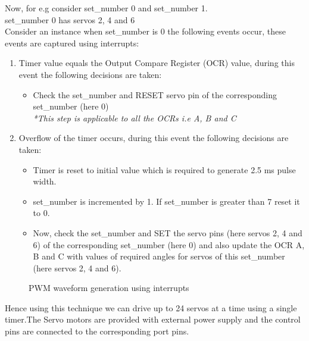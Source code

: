 \documentclass[12pt]{article}
\begin{document}
\vspace{2cm}
Now, for e.g consider set\_number 0 and set\_number 1.\\
set\_number 0 has servos 2, 4 and 6\\
Consider an instance when set\_number is 0 the following events occur, these events are
captured using interrupts:\\
\begin{enumerate}
	\item Timer value equals the Output Compare Register (OCR) value, during this event
	the following decisions are taken:
	\begin{itemize}
	\item Check the set\_number and RESET servo pin of the corresponding
	set\_number (here 0)\\
	\textit{*This step is applicable to all the OCRs i.e A, B and C}
	\end{itemize}
	\item Overflow of the timer occurs, during this event the following decisions are
	taken:
	\begin{itemize}
		\item Timer is reset to initial value which is required to generate 2.5 ms pulse
		width.
		\item set\_number is incremented by 1. If set\_number is greater than 7 reset it to
		0.
		\item Now, check the set\_number and SET the servo pins (here servos 2, 4 and
		6) of the corresponding set\_number (here 0) and also update the OCR A,
		B and C with values of required angles for servos of this set\_number
		(here servos 2, 4 and 6).
	\end{itemize}
\end{enumerate}
\newpage
\begin{figure}[h!]
	\centering
	\caption{PWM waveform generation using interrupts}
\end{figure}
Hence using this technique we can drive up to 24 servos at a time using a single timer.The
	Servo motors are provided with external power supply and the control pins are connected
	to the corresponding port pins.
\end{document}

